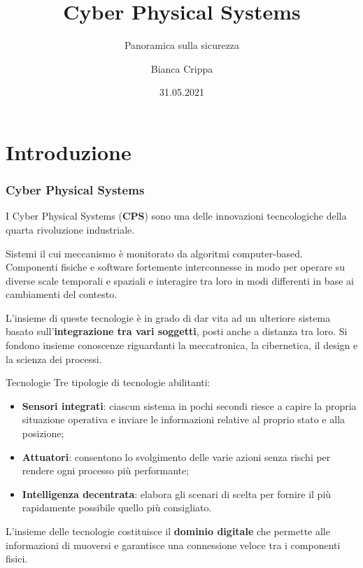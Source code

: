 \documentclass{beamer}
\title{Cyber Physical Systems}
\subtitle{Panoramica sulla sicurezza}
\author{Bianca Crippa}
\institute{Università degli Studi di Bergamo
    \\ \url{https://github.com/Biancolinaa/CPS-presentation.git}
}
\date{31.05.2021}
\begin{document}
\frame{\titlepage}


\section{Introduzione}

\begin{frame}
    \frametitle{Cyber Physical Systems}
    I Cyber Physical Systems (\textbf{CPS}) sono una delle innovazioni tecncologiche della quarta rivoluzione industriale.
    
    Sistemi il cui meccanismo è monitorato da algoritmi computer-based. 
    Componenti fisiche e software fortemente interconnesse in modo per operare su diverse scale temporali e spaziali e  
    interagire tra loro in modi differenti in base ai cambiamenti del contesto. 

    L'insieme di queste tecnologie è in grado di dar vita ad un ulteriore sistema basato sull'\textbf{integrazione tra vari soggetti}, posti anche a 
    distanza tra loro.    
    Si fondono insieme conoscenze riguardanti la meccatronica, la cibernetica, il design e la scienza dei processi.
    
\end{frame}

\begin{frame}{Tecnologie}
Tre tipologie di tecnologie abilitanti:
\begin{itemize}
    \item \textbf{Sensori integrati}: ciascun sistema in pochi secondi riesce a capire la propria situazione operativa e inviare le informazioni relative al 
    proprio stato e alla posizione;
    \item \textbf{Attuatori}: consentono lo svolgimento delle varie azioni senza rischi per rendere ogni processo più performante;
    \item \textbf{Intelligenza decentrata}: elabora gli scenari di scelta per fornire il più rapidamente possibile quello più consigliato.
\end{itemize}

L'insieme delle tecnologie costituisce il \textbf{dominio digitale} che permette alle informazioni di muoversi e garantisce una connessione veloce tra i 
componenti fisici.

\end{frame}
\end{document}

